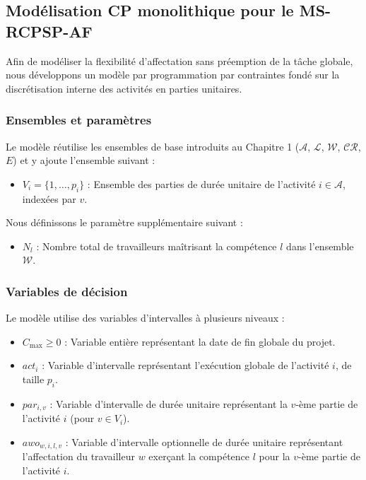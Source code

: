 \subsection{Modélisation CP monolithique pour le MS-RCPSP-AF}
Afin de modéliser la flexibilité d'affectation sans préemption de la tâche globale, nous développons un modèle par programmation par contraintes fondé sur la discrétisation interne des activités en parties unitaires.

\subsubsection{Ensembles et paramètres}
Le modèle réutilise les ensembles de base introduits au Chapitre 1 ($\mathcal{A}$, $\mathcal{L}$, $\mathcal{W}$, $\mathcal{CR}$, $E$) et y ajoute l'ensemble suivant :
\begin{itemize}
    \item $V_i = \{1, \dots, p_i\}$ : Ensemble des parties de durée unitaire de l'activité $i \in \mathcal{A}$, indexées par $v$.
\end{itemize}

Nous définissons le paramètre supplémentaire suivant :
\begin{itemize}
    \item $N_l$ : Nombre total de travailleurs maîtrisant la compétence $l$ dans l'ensemble $\mathcal{W}$.
\end{itemize}

\subsubsection{Variables de décision}
Le modèle utilise des variables d'intervalles à plusieurs niveaux :
\begin{itemize}
    \item $C_{\max} \ge 0$ : Variable entière représentant la date de fin globale du projet.
    \item $act_i$ : Variable d'intervalle représentant l'exécution globale de l'activité $i$, de taille $p_i$.
    \item $par_{i,v}$ : Variable d'intervalle de durée unitaire représentant la $v$-ème partie de l'activité $i$ (pour $v \in V_i$).
    \item $awo_{w,i,l,v}$ : Variable d'intervalle optionnelle de durée unitaire représentant l'affectation du travailleur $w$ exerçant la compétence $l$ pour la $v$-ème partie de l'activité $i$.
\end{itemize}

